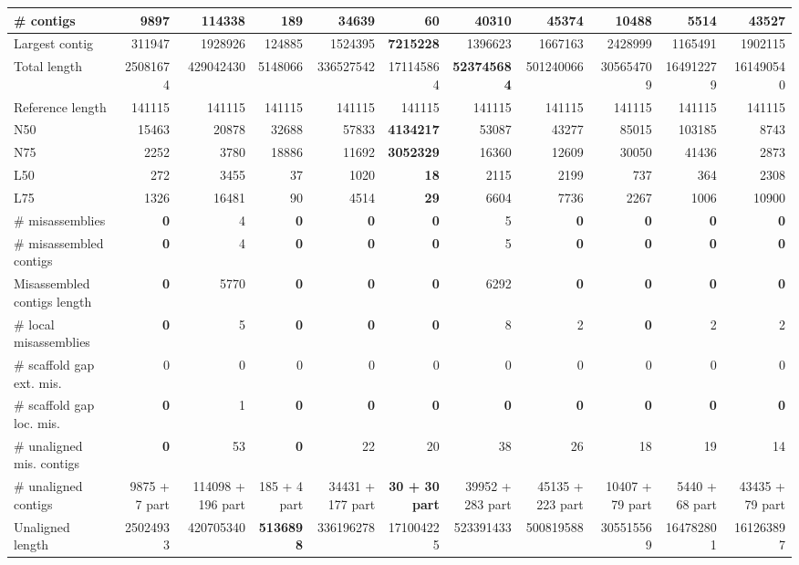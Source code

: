 \documentclass[12pt,a4paper]{article}
\begin{document}
\begin{table}[ht]
\begin{center}
\begin{tabular}{|l*{10}{|r}|}
\# contigs & 9897 & 114338 & 189 & 34639 & 60 & 40310 & 45374 & 10488 & 5514 & 43527 \\ \hline
Largest contig & 311947 & 1928926 & 124885 & 1524395 & {\bf 7215228} & 1396623 & 1667163 & 2428999 & 1165491 & 1902115 \\ \hline
Total length & 25081674 & 429042430 & 5148066 & 336527542 & 171145864 & {\bf 523745684} & 501240066 & 305654709 & 164912279 & 161490540 \\ \hline
Reference length & 141115 & 141115 & 141115 & 141115 & 141115 & 141115 & 141115 & 141115 & 141115 & 141115 \\ \hline
N50 & 15463 & 20878 & 32688 & 57833 & {\bf 4134217} & 53087 & 43277 & 85015 & 103185 & 8743 \\ \hline
N75 & 2252 & 3780 & 18886 & 11692 & {\bf 3052329} & 16360 & 12609 & 30050 & 41436 & 2873 \\ \hline
L50 & 272 & 3455 & 37 & 1020 & {\bf 18} & 2115 & 2199 & 737 & 364 & 2308 \\ \hline
L75 & 1326 & 16481 & 90 & 4514 & {\bf 29} & 6604 & 7736 & 2267 & 1006 & 10900 \\ \hline
\# misassemblies & {\bf 0} & 4 & {\bf 0} & {\bf 0} & {\bf 0} & 5 & {\bf 0} & {\bf 0} & {\bf 0} & {\bf 0} \\ \hline
\# misassembled contigs & {\bf 0} & 4 & {\bf 0} & {\bf 0} & {\bf 0} & 5 & {\bf 0} & {\bf 0} & {\bf 0} & {\bf 0} \\ \hline
Misassembled contigs length & {\bf 0} & 5770 & {\bf 0} & {\bf 0} & {\bf 0} & 6292 & {\bf 0} & {\bf 0} & {\bf 0} & {\bf 0} \\ \hline
\# local misassemblies & {\bf 0} & 5 & {\bf 0} & {\bf 0} & {\bf 0} & 8 & 2 & {\bf 0} & 2 & 2 \\ \hline
\# scaffold gap ext. mis. & 0 & 0 & 0 & 0 & 0 & 0 & 0 & 0 & 0 & 0 \\ \hline
\# scaffold gap loc. mis. & {\bf 0} & 1 & {\bf 0} & {\bf 0} & {\bf 0} & {\bf 0} & {\bf 0} & {\bf 0} & {\bf 0} & {\bf 0} \\ \hline
\# unaligned mis. contigs & {\bf 0} & 53 & {\bf 0} & 22 & 20 & 38 & 26 & 18 & 19 & 14 \\ \hline
\# unaligned contigs & 9875 + 7 part & 114098 + 196 part & 185 + 4 part & 34431 + 177 part & {\bf 30 + 30 part} & 39952 + 283 part & 45135 + 223 part & 10407 + 79 part & 5440 + 68 part & 43435 + 79 part \\ \hline
Unaligned length & 25024933 & 420705340 & {\bf 5136898} & 336196278 & 171004225 & 523391433 & 500819588 & 305515569 & 164782801 & 161263897 \\ \hline

\end{tabular}
\end{center}
\end{table}
\end{document}
